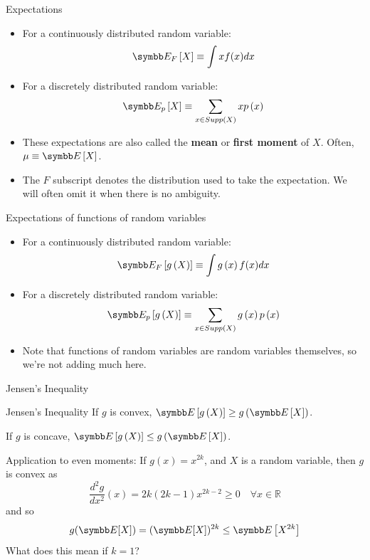 \documentclass[aspectratio=169,11pt]{beamer}
\begin{document}
\begin{frame}{Expectations}
\begin{itemize}
	\item For a continuously distributed random variable:\[
		\E_F \left[ X \right] \equiv \int xf(x)dx
	\]
	
	\medskip
	\item For a discretely distributed random variable:\[
		\E_p \left[ X \right] \equiv \sum_{x\in Supp\left(X\right)} x p\left(x\right)
	\]
	
	\medskip
	\item These expectations are also called the {\bf mean} or {\bf first moment} of $X$. Often, $\mu\equiv \E\left[X\right]$.
		
	\medskip
	\item The $F$ subscript denotes the distribution used to take the expectation. We will often omit it when there is no ambiguity.
\end{itemize}
\end{frame}


\begin{frame}{Expectations of functions of random variables}
\begin{itemize}
	\item For a continuously distributed random variable:\[
		\E_F \left[ g\left(X\right) \right] \equiv \int g\left(x\right)f(x)dx
	\]
	
	\medskip
	\item For a discretely distributed random variable:\[
		\E_p \left[ g\left(X\right) \right] \equiv \sum_{x\in Supp\left(X\right)} g\left(x\right) p\left(x\right)
	\]
	
	\medskip
	\item Note that functions of random variables are random variables themselves, so we're not adding much here.

\end{itemize}
\end{frame}



\begin{frame}{Jensen's Inequality}
\begin{center}
\begin{minipage}{.8\textwidth}
\begin{block}{Jensen's Inequality}
If $g$ is convex, $\E\left[g\left(X\right)\right] \ge g\left(\E\left[X\right]\right)$.

\medskip
If $g$ is concave, $\E\left[g\left(X\right)\right] \le g\left(\E\left[X\right]\right)$.
\end{block}
\end{minipage}
\end{center}
\vspace{0.2cm}
\pause
Application to even moments:
If $g(x)=x^{2 k}$, and $X$ is a random variable, then $g$ is convex as
$$
\frac{d^2 g}{d x^2}(x)=2 k(2 k-1) x^{2 k-2} \geq 0 \quad \forall x \in \mathbb{R}
$$
and so
$$
g(\E[X])=(\E[X])^{2 k} \leq \E\left[X^{2 k}\right]
$$
What does this mean if $k=1$?
\end{frame}
\end{document}
